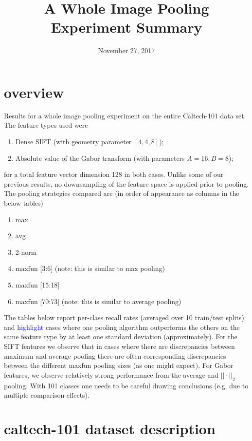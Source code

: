 \documentclass[10pt]{article}
\title{A Whole Image Pooling Experiment Summary}
\date{November 27, 2017}
\newcommand{\hl}[1]{\textcolor{blue}{#1}}
\begin{document}
\maketitle

\section*{overview}
Results for a whole image pooling experiment on the entire Caltech-101 data set.  The feature types used were
\begin{enumerate}
\item Dense SIFT (with geometry parameter $[4, 4, 8]$);
\item Absolute value of the Gabor transform (with parameters $A=16, B=8$);
\end{enumerate}
%
for a total feature vector dimension 128 in both cases.
Unlike some of our previous results, no downsampling of the feature space is applied prior to pooling.
The pooling strategies compared are (in order of appearance as columns in the below tables)
%
\begin{enumerate}
\item max
\item avg
\item 2-norm
\item maxfun [3:6]       (note: this is similar to max pooling)
\item maxfun [15:18]
\item maxfun [70:73]  (note: this is similar to average pooling)
\end{enumerate}


The tables below report per-class recall rates (averaged over 10 train/test splits) and \hl{highlight} cases where one pooling algorithm outperforms the others on the same feature type by at least one standard deviation (approximately).
For the SIFT features we observe that in cases where there are discrepancies between maximum and average pooling there are often corresponding discrepancies between the different maxfun pooling sizes (as one might expect).
For Gabor features, we observe relatively strong performance from the average and $||\cdot||_2$ pooling.
With 101 classes one needs to be careful drawing conclusions (e.g. due to multiple comparison effects).


\section*{caltech-101 dataset description}
\end{document}
